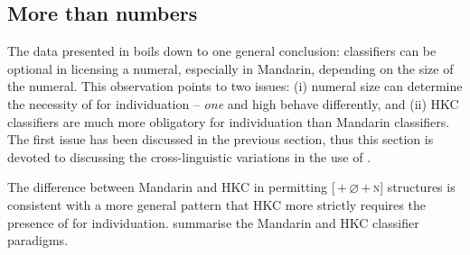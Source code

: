 \documentclass[output=paper]{langsci/langscibook}
\begin{document}
\subsection{More than numbers}\label{sub:23.2.3}

The data presented in  boils down to one general conclusion:
classifiers can be optional in licensing a numeral, especially in
Mandarin, depending on the size of the numeral. This
observation points to two issues: (i) numeral size can determine
the necessity of  for individuation -- \emph{one} and high
 behave differently, and (ii) \gls{HKC} classifiers are much more
obligatory for individuation than Mandarin classifiers. The first issue has
been discussed in the previous section, thus this section is devoted to
discussing the cross-linguistic variations in the use of .

The difference between Mandarin and \gls{HKC} in permitting [\Num{}\,$+$\,${\varnothing}$\,$+$\,\textsc{n}]
structures is consistent with a more general pattern that
\gls{HKC} more strictly requires the presence of  for individuation.
 summarise the Mandarin and \gls{HKC} classifier
paradigms.
\end{document}
